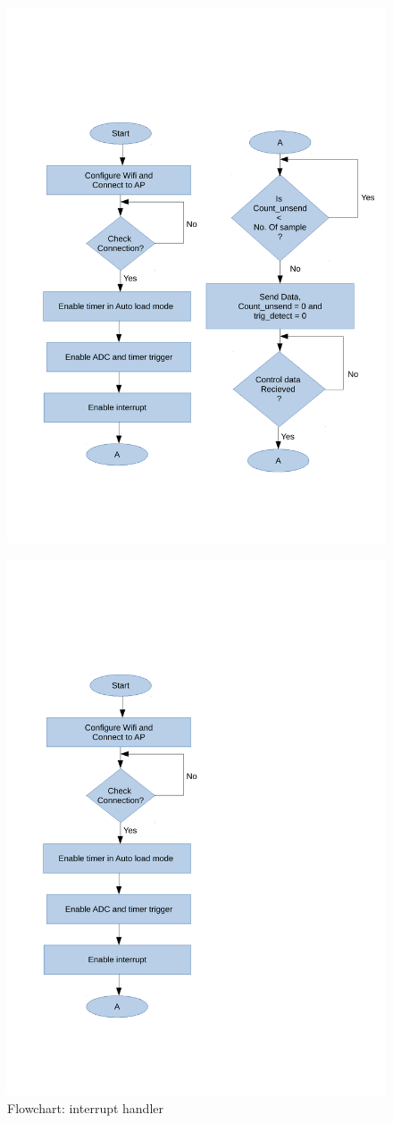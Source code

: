 \documentclass{article}
\begin{document}
	\begin{figure}[!]
		\centering
		\includegraphics[width=0.7\linewidth]{flowchart_main}
		\caption{}
		\label{fig:flowchartmain}
	\end{figure}


	\begin{figure}[!]
		\centering
		\includegraphics[width=0.7\linewidth]{"report embedded3"}
		\caption{Flowchart: interrupt handler}
		\label{fig:report-embedded3}
	\end{figure}
	
\end{document}
